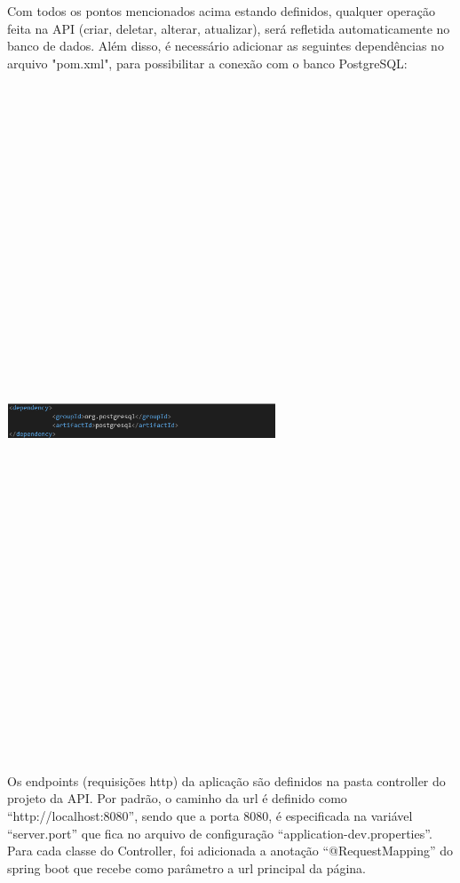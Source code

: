 \documentclass[conference]{IEEEtran}
\begin{document}
Com todos os pontos mencionados acima estando definidos, qualquer operação feita na API (criar, deletar, alterar, atualizar), será refletida automaticamente no banco de dados.
Além disso, é necessário adicionar as seguintes dependências no arquivo "pom.xml", para possibilitar a conexão com o banco PostgreSQL:

\vspace{7mm}
\centerline{\includegraphics[width=80mm,height=200mm,keepaspectratio]{Postgresql2.png}}
\vspace{7mm}

Os endpoints (requisições http) da aplicação são definidos na pasta controller do projeto da API. Por padrão, o caminho da url é definido como “http://localhost:8080”, sendo que a porta 8080, é especificada na variável “server.port” que fica no arquivo de configuração “application-dev.properties”.
Para cada classe do Controller, foi adicionada a anotação “@RequestMapping” do spring boot que recebe como parâmetro a url principal da página.
\end{document}
